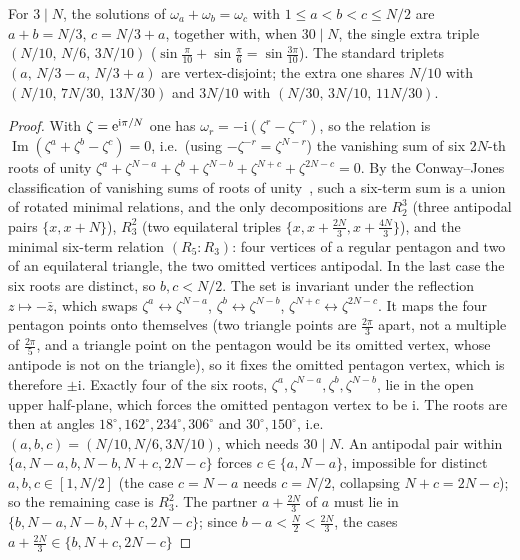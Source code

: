 \begin{lemma}\label{lem:cleancomb}
For $3\mid N$, the solutions of $\omega_a+\omega_b=\omega_c$ with $1\le a<b<c\le N/2$ are
$a+b=N/3$, $c=N/3+a$, together with, when $30\mid N$, the single extra triple $(N/10,\,N/6,\,3N/10)$
($\sin\tfrac\pi{10}+\sin\tfrac\pi6=\sin\tfrac{3\pi}{10}$). The standard triplets $(a,\,N/3-a,\,N/3+a)$ are
vertex-disjoint; the extra one shares $N/10$ with $(N/10,\,7N/30,\,13N/30)$ and $3N/10$ with
$(N/30,\,3N/10,\,11N/30)$.
\end{lemma}
\begin{proof}
With $\zeta=\mathrm{e}^{\mathrm i\pi/N}$ one has $\omega_r=-\mathrm i(\zeta^r-\zeta^{-r})$, so the relation is
$\operatorname{Im}(\zeta^a+\zeta^b-\zeta^c)=0$, i.e.\ (using $-\zeta^{-r}=\zeta^{N-r}$) the vanishing sum of
six $2N$-th roots of unity $\zeta^a+\zeta^{N-a}+\zeta^b+\zeta^{N-b}+\zeta^{N+c}+\zeta^{2N-c}=0$. By the
Conway--Jones classification of vanishing sums of roots of unity~\cite{CJ}, such a six-term sum is a union of
rotated minimal relations, and the only decompositions are $R_2^3$ (three antipodal pairs $\{x,x+N\}$),
$R_3^2$ (two equilateral triples $\{x,x+\tfrac{2N}3,x+\tfrac{4N}3\}$), and the minimal six-term relation
$(R_5{:}R_3)$: four vertices of a regular pentagon and two of an equilateral triangle, the two omitted vertices
antipodal. In the last case the six roots are distinct, so $b,c<N/2$. The set is invariant under the
reflection $z\mapsto-\bar z$, which swaps $\zeta^a\leftrightarrow\zeta^{N-a}$, $\zeta^b\leftrightarrow\zeta^{N-b}$,
$\zeta^{N+c}\leftrightarrow\zeta^{2N-c}$. It maps the four pentagon points onto themselves (two triangle points
are $\tfrac{2\pi}3$ apart, not a multiple of $\tfrac{2\pi}5$, and a triangle point on the pentagon would be its
omitted vertex, whose antipode is not on the triangle), so it fixes the omitted pentagon vertex, which is
therefore $\pm\mathrm i$. Exactly four of the six roots, $\zeta^a,\zeta^{N-a},\zeta^b,\zeta^{N-b}$, lie in
the open upper half-plane, which forces the omitted pentagon vertex to be $\mathrm i$. The roots are then at
angles $18^\circ,162^\circ,234^\circ,306^\circ$ and $30^\circ,150^\circ$, i.e.\ $(a,b,c)=(N/10,N/6,3N/10)$, which
needs $30\mid N$. An antipodal pair within
$\{a,N-a,b,N-b,N+c,2N-c\}$ forces $c\in\{a,N-a\}$, impossible for distinct $a,b,c\in[1,N/2]$ (the case
$c=N-a$ needs $c=N/2$, collapsing $N+c=2N-c$); so the remaining case is $R_3^2$. The partner $a+\tfrac{2N}3$ of $a$ must
lie in $\{b,N-a,N-b,N+c,2N-c\}$; since $b-a<\tfrac N2<\tfrac{2N}3$, the cases $a+\tfrac{2N}3\in\{b,N+c,2N-c\}$

\end{proof}
